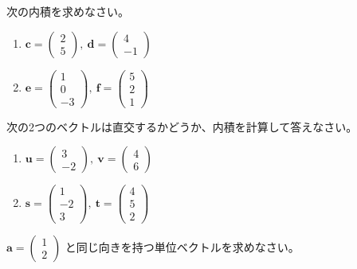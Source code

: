 \begin{quiz}
次の内積を求めなさい。
\begin{enumerate}
\item $\bm{c} = \begin{pmatrix} 2 \\ 5 \end{pmatrix},\ \bm{d} = \begin{pmatrix} 4 \\ -1 \end{pmatrix}$
\item $\bm{e} = \begin{pmatrix} 1 \\ 0 \\ -3 \end{pmatrix},\ \bm{f} = \begin{pmatrix} 5 \\ 2 \\ 1 \end{pmatrix}$
\end{enumerate}
\end{quiz}

\begin{quiz}
次の2つのベクトルは直交するかどうか、内積を計算して答えなさい。
\begin{enumerate}
\item $\bm{u} = \begin{pmatrix} 3 \\ -2 \end{pmatrix},\ \bm{v} = \begin{pmatrix} 4 \\ 6 \end{pmatrix}$
\item $\bm{s} = \begin{pmatrix} 1 \\ -2 \\ 3 \end{pmatrix},\ \bm{t} = \begin{pmatrix} 4 \\ 5 \\ 2 \end{pmatrix}$
\end{enumerate}
\end{quiz}

\begin{quiz}
$\bm{a} = \begin{pmatrix} 1 \\ 2 \end{pmatrix}$ と同じ向きを持つ単位ベクトルを求めなさい。
\end{quiz}